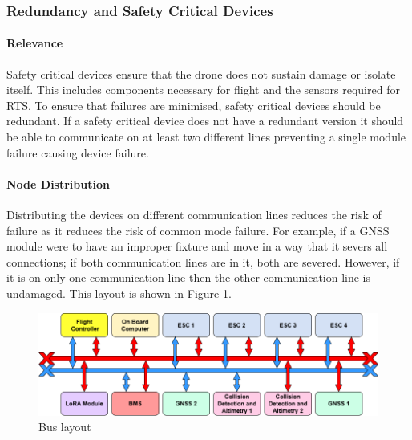 \subsubsection{Redundancy and Safety Critical Devices}\label{sub_sub_section:tgt_redundancy}
\paragraph{Relevance}
Safety critical devices ensure that the drone does not sustain damage or isolate itself. This includes components necessary for flight and the sensors required for \gls{RTS}. To ensure that failures are minimised, safety critical devices should be redundant. If a safety critical device does not have a redundant version it should be able to communicate on at least two different lines preventing a single module failure causing device failure.
\paragraph{Node Distribution}
Distributing the devices on different communication lines reduces the risk of failure as it reduces the risk of common mode failure. For example, if a \gls{GNSS} module were to have an improper fixture and move in a way that it severs all connections; if both communication lines are in it, both are severed. However, if it is on only one communication line then the other communication line is undamaged. This layout is shown in Figure \ref{fig:CAN_bus}. 
 \begin{figure}[h!]
 \centering
  \includegraphics[width=1\textwidth]{figs/Thomas/Intra Communication/CAN bus.png}
 \caption{Bus layout}
 \label{fig:CAN_bus}
 \end{figure}